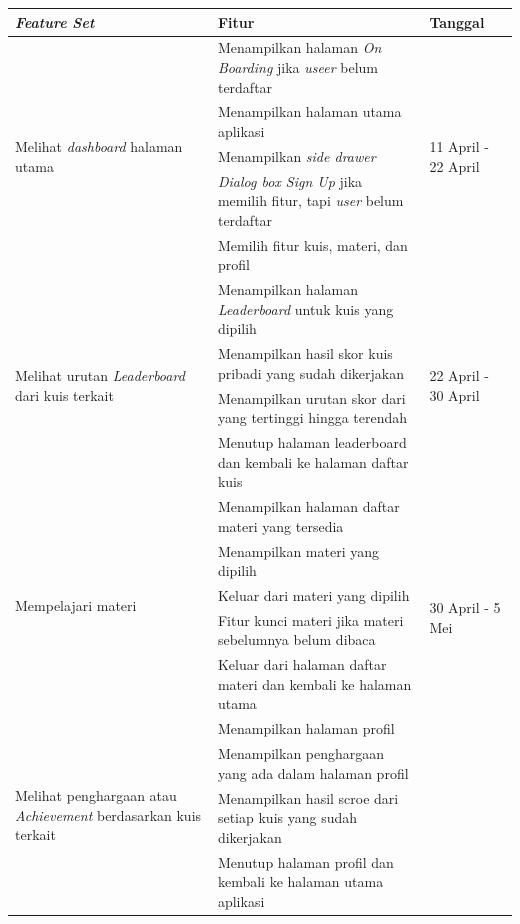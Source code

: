 \newpage
\begin{table}[H]
	\begin{tabular}{|m{3cm}|p{}|p{2cm}|}
		\hline
		\centering\textbf{\textit{Feature Set}} & \centering\textbf{Fitur} & \multicolumn{1}{m{2cm}|}{\centering \textbf{Tanggal}} \\
		\hline
		\multirow{5}{2.5cm}{Melihat \textit{dashboard} halaman utama} &Menampilkan halaman \textit{On Boarding} jika \textit{useer} belum terdaftar &\multirow{5}{2cm}{11 April - 22 April}\\
		\cline{2-2}
		&Menampilkan halaman utama aplikasi&  \\
		\cline{2-2}
		&Menampilkan \textit{side drawer}&  \\
		\cline{2-2}
		&\textit{Dialog box Sign Up} jika memilih fitur, tapi \textit{user} belum terdaftar&  \\
		\cline{2-2}
		&Memilih fitur kuis, materi, dan profil&  \\
		\hline
		\multirow{4}{2.5cm}{Melihat urutan \textit{Leaderboard} dari kuis terkait} &Menampilkan halaman \textit{Leaderboard} untuk kuis yang dipilih & \multirow{4}{2cm}{22 April - 30 April} \\
		\cline{2-2}
		&Menampilkan hasil skor kuis pribadi yang sudah dikerjakan&  \\
		\cline{2-2}
		&Menampilkan urutan skor dari yang tertinggi hingga terendah&  \\
		\cline{2-2}
		&Menutup halaman leaderboard dan kembali ke halaman daftar kuis&  \\
		\hline
		\multirow{5}{2.5cm}{Mempelajari materi} &Menampilkan halaman daftar materi yang tersedia& \multirow{6}{2.5cm}{30 April - 5 Mei} \\
		\cline{2-2}
		&Menampilkan materi yang dipilih &  \\
		\cline{2-2}
		&Keluar dari materi yang dipilih&  \\
		\cline{2-2}
		&Fitur kunci materi jika materi sebelumnya belum dibaca&  \\
		\cline{2-2}
		&Keluar dari halaman daftar materi dan kembali ke halaman utama&  \\
		\hline
		\multirow{4}{3cm}{Melihat penghargaan atau \textit{Achievement} berdasarkan kuis terkait} &Menampilkan halaman profil& \multirow{4}{2cm}{5 Mei - 12 Mei} \\
		\cline{2-2}
		&Menampilkan penghargaan yang ada dalam halaman profil&  \\
		\cline{2-2}
		&Menampilkan hasil scroe dari setiap kuis yang sudah dikerjakan&  \\
		\cline{2-2}
		&Menutup halaman profil dan kembali ke halaman utama aplikasi&  \\
		\hline
	\end{tabular}
\end{table}
\newpage
